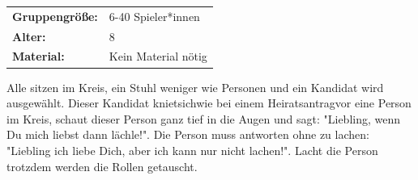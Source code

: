 \begin{table}[H]
\begin{tabular}{>{\bfseries}lp{8cm}}
   Gruppengröße:   & 6-40 Spieler*innen\\
    Alter: & 8 \\
    Material: & Kein Material nötig\\ 
\end{tabular}
\end{table} 

Alle sitzen im Kreis, ein Stuhl weniger wie Personen und ein Kandidat wird ausgewählt. Dieser Kandidat knietsichwie bei einem Heiratsantragvor eine Person im Kreis, schaut dieser Person ganz tief in die Augen und sagt: "Liebling, wenn Du mich liebst dann lächle!". Die Person muss antworten ohne zu lachen: "Liebling ich liebe Dich, aber ich kann nur nicht lachen!". Lacht die Person trotzdem werden die Rollen getauscht.\\

